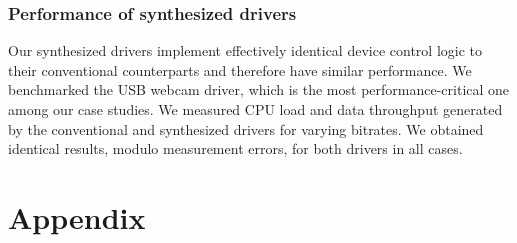 \documentclass{book}
\theoremstyle{definition}
\begin{document}
\subsection{Performance of synthesized drivers} 
Our synthesized drivers implement effectively identical device control logic to their conventional counterparts and therefore have similar performance.  We benchmarked the USB webcam driver, which is the most performance-critical one among our case studies.  We measured CPU load and data throughput generated by the conventional and synthesized drivers for varying bitrates.  We obtained identical results, modulo measurement errors, for both drivers in all cases.

\chapter{Appendix}
\end{document}
